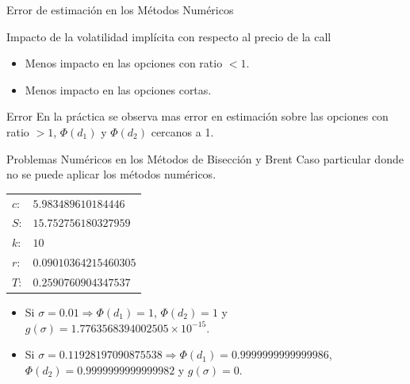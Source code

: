 \documentclass{beamer}
\begin{document}
\begin{frame}{Error de estimaci\'on en los M\'etodos Num\'ericos}

  \begin{block}{Impacto de la volatilidad impl\'icita con respecto al precio de la call}    
    \begin{itemize}
      \item Menos impacto en las opciones con ratio $< 1$.
      \item Menos impacto en las opciones cortas.
    \end{itemize}
  \end{block}

  \begin{block}{Error}
    En la pr\'actica se observa mas error en estimaci\'on sobre las opciones con ratio $> 1$, $\Phi(d_1)$ y
    $\Phi(d_2)$ cercanos a 1.
  \end{block}

\end{frame}

\begin{frame}{Problemas Num\'ericos en los M\'etodos de Bisecci\'on y Brent}
  Caso particular donde no se puede aplicar los m\'etodos num\'ericos.
  \begin{table}[!htbp]
    \centering
    \begin{tabular}{|ll|}
      \hline
      $c$: & $5.983489610184446$  \\ 
      $S$: & $15.752756180327959$  \\             %
      $k$: & $10$   \\ %
      $r$: & $0.09010364215460305$ \\               %
      $T$: & $0.2590760904347537$  \\ \hline
    \end{tabular}
  \end{table}

  \begin{itemize}
    \item Si $\sigma = 0.01 \Rightarrow \Phi(d_1) = 1$, $\Phi(d_2) = 1$ y $g(\sigma) = 1.7763568394002505\times10^{-15}$.
    \item Si $\sigma = 0.11928197090875538 \Rightarrow \Phi(d_1) = 0.9999999999999986$, $\Phi(d_2) = 0.9999999999999982$ y $g(\sigma) = 0$.
  \end{itemize}

\end{frame}
\end{document}
